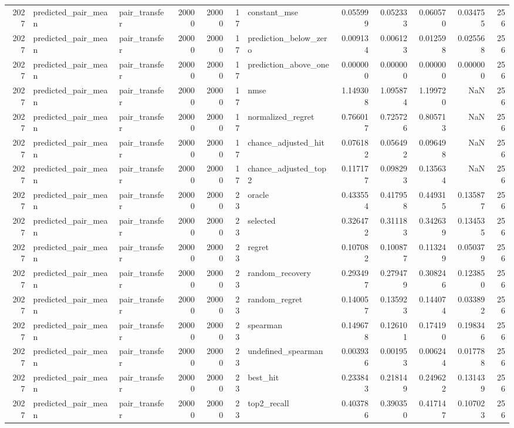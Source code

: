 \begin{tabular}{rllrrrlrrrrr}
2027 & predicted_pair_mean & pair_transfer & 20000 & 20000 & 17 & constant_mse & 0.055999 & 0.052333 & 0.060570 & 0.034755 & 256 \\
2027 & predicted_pair_mean & pair_transfer & 20000 & 20000 & 17 & prediction_below_zero & 0.009134 & 0.006123 & 0.012598 & 0.025568 & 256 \\
2027 & predicted_pair_mean & pair_transfer & 20000 & 20000 & 17 & prediction_above_one & 0.000000 & 0.000000 & 0.000000 & 0.000000 & 256 \\
2027 & predicted_pair_mean & pair_transfer & 20000 & 20000 & 17 & nmse & 1.149308 & 1.095874 & 1.199720 & NaN & 256 \\
2027 & predicted_pair_mean & pair_transfer & 20000 & 20000 & 17 & normalized_regret & 0.766017 & 0.725726 & 0.805713 & NaN & 256 \\
2027 & predicted_pair_mean & pair_transfer & 20000 & 20000 & 17 & chance_adjusted_hit & 0.076182 & 0.056492 & 0.096498 & NaN & 256 \\
2027 & predicted_pair_mean & pair_transfer & 20000 & 20000 & 17 & chance_adjusted_top2 & 0.117177 & 0.098293 & 0.135634 & NaN & 256 \\
2027 & predicted_pair_mean & pair_transfer & 20000 & 20000 & 23 & oracle & 0.433554 & 0.417958 & 0.449315 & 0.135877 & 256 \\
2027 & predicted_pair_mean & pair_transfer & 20000 & 20000 & 23 & selected & 0.326472 & 0.311183 & 0.342639 & 0.134535 & 256 \\
2027 & predicted_pair_mean & pair_transfer & 20000 & 20000 & 23 & regret & 0.107082 & 0.100877 & 0.113249 & 0.050379 & 256 \\
2027 & predicted_pair_mean & pair_transfer & 20000 & 20000 & 23 & random_recovery & 0.293497 & 0.279479 & 0.308246 & 0.123850 & 256 \\
2027 & predicted_pair_mean & pair_transfer & 20000 & 20000 & 23 & random_regret & 0.140057 & 0.135923 & 0.144074 & 0.033892 & 256 \\
2027 & predicted_pair_mean & pair_transfer & 20000 & 20000 & 23 & spearman & 0.149678 & 0.126101 & 0.174190 & 0.198346 & 256 \\
2027 & predicted_pair_mean & pair_transfer & 20000 & 20000 & 23 & undefined_spearman & 0.003936 & 0.001953 & 0.006244 & 0.017788 & 256 \\
2027 & predicted_pair_mean & pair_transfer & 20000 & 20000 & 23 & best_hit & 0.233843 & 0.218149 & 0.249622 & 0.131439 & 256 \\
2027 & predicted_pair_mean & pair_transfer & 20000 & 20000 & 23 & top2_recall & 0.403786 & 0.390350 & 0.417147 & 0.107023 & 256 \\

\end{tabular}
